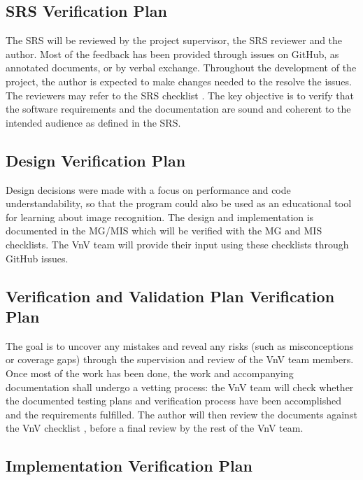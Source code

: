 \documentclass[12pt, titlepage]{article}
\begin{document}
\subsection{SRS Verification Plan}

The SRS will be reviewed by the project supervisor, the SRS reviewer and the author. Most of the feedback has been provided 
through issues on GitHub, as annotated documents, or by verbal exchange. 
Throughout the development of the project, the author is expected 
to make changes needed to the resolve the issues. The reviewers may refer to the SRS checklist \citep{SRS_checklist}.
The key objective is to verify that the software requirements and the documentation are sound 
and coherent to the intended audience as defined in the SRS.

\subsection{Design Verification Plan}

Design decisions were made with a focus on performance and code understandability, so that the program could also be used 
as an educational tool for learning about image recognition. The design and implementation is documented in the 
MG/MIS \citep{MG, MIS} which will be verified with the MG 
and MIS \citep{MG_checklist, MIS_checklist} checklists.
The VnV team will provide their input using these checklists through GitHub issues. 

\subsection{Verification and Validation Plan Verification Plan}

The goal is to uncover any mistakes and reveal any risks (such as misconceptions or coverage gaps) 
through the supervision and 
review of the VnV team members. Once most of the work has been done, the work and
accompanying documentation shall undergo a vetting process: the VnV team
will check whether the documented testing plans and verification process have been 
accomplished and the requirements fulfilled. The author will then review the documents
against the VnV checklist \citep{VnV_checklist}, before a final review by the rest of the VnV team.

\subsection{Implementation Verification Plan}
\end{document}
